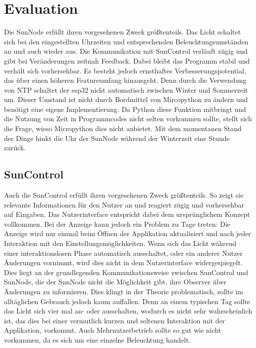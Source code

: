 \chapter{Evaluation}
\label{SunNode}
Die SunNode erfüllt ihren vorgesehenen Zweck größtenteils. Das Licht schaltet sich bei den eingestellten Uhrzeiten und entsprechenden Beleuchtungsumständen an und auch wieder aus. Die Kommunikation mit SunControl verläuft zügig und gibt bei Veränderungen zeitnah Feedback. Dabei bleibt das Programm stabil und verhält sich vorhersehbar.
Es besteht jedoch ernsthaftes Verbesserungspotential, das über einen höheren Featureumfang hinausgeht. Denn durch die Verwendung von NTP schaltet der esp32 nicht automatisch zwischen Winter und Sommerzeit um. Dieser Umstand ist nicht durch Bordmittel von Mircopython zu ändern und benötigt eine eigene Implementierung. Da  Python diese Funktion mitbringt und die Nutzung von Zeit in Programmcodes nicht selten vorkommen sollte, stellt sich die Frage, wieso Micropython dies nicht anbietet. Mit dem momentanen Stand der Dinge hinkt die Uhr der SunNode während der Winterzeit eine Stunde zurück.

\section{SunControl}
Auch die SunControl erfüllt ihren vorgesehenen Zweck größtenteils. So zeigt sie relevante Informationen für den Nutzer an und reagiert zügig und vorhersehbar auf Eingaben. Das Nutzerinterface entspricht dabei dem ursprünglichem Konzept vollkommen. Bei der Anzeige kann jedoch ein Problem zu Tage treten: Die Anzeige wird nur einmal beim Öffnen der Applikation aktualisiert und nach jeder Interaktion mit den Einstellungsmöglichkeiten. Wenn sich das Licht während einer interaktionslosen Phase automatisch ausschaltet, oder ein anderer Nutzer Änderungen vornimmt, wird dies nicht in dem Nutzerinterface widergespiegelt. Dies liegt an der grundlegenden Kommunikationsweise zwischen SunControl und SunNode, die der SunNode nicht die Möglichkeit gibt, ihre Observer über Änderungen zu informieren. Dies klingt in der Theorie problematisch, sollte im alltäglichen Gebrauch jedoch kaum auffallen. Denn an einem typischen Tag sollte das Licht sich vier mal an- oder ausschalten, wodurch es nicht sehr wahrscheinlich ist, das dies bei einer vermutlich kurzen und seltenen Interaktion mit der Applikation, vorkommt. Auch Mehrnutzerbetrieb sollte so gut wie nicht vorkommen, da es sich um eine einzelne Beleuchtung handelt.

